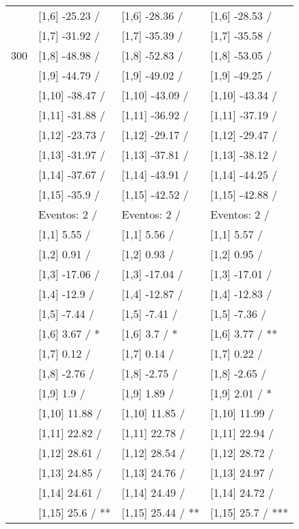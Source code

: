 \begin{table}
\begin{tabular}[t]{llll}
 & {}[1,6] -25.23  / & {}[1,6] -28.36  / & {}[1,6] -28.53  /\\
 & {}[1,7] -31.92  / & {}[1,7] -35.39  / & {}[1,7] -35.58  /\\
300 & {}[1,8] -48.98  / & {}[1,8] -52.83  / & {}[1,8] -53.05  /\\
\addlinespace
 & {}[1,9] -44.79  / & {}[1,9] -49.02  / & {}[1,9] -49.25  /\\
 & {}[1,10] -38.47  / & {}[1,10] -43.09  / & {}[1,10] -43.34  /\\
 & {}[1,11] -31.88  / & {}[1,11] -36.92  / & {}[1,11] -37.19  /\\
 & {}[1,12] -23.73  / & {}[1,12] -29.17  / & {}[1,12] -29.47  /\\
 & {}[1,13] -31.97  / & {}[1,13] -37.81  / & {}[1,13] -38.12  /\\
\addlinespace
 & {}[1,14] -37.67  / & {}[1,14] -43.91  / & {}[1,14] -44.25  /\\
 & {}[1,15] -35.9  / & {}[1,15] -42.52  / & {}[1,15] -42.88  /\\
 & Eventos:  2 / & Eventos:  2 / & Eventos:  2 /\\
 & {}[1,1] 5.55  / & {}[1,1] 5.56  / & {}[1,1] 5.57  /\\
 & {}[1,2] 0.91  / & {}[1,2] 0.93  / & {}[1,2] 0.95  /\\
\addlinespace
 & {}[1,3] -17.06  / & {}[1,3] -17.04  / & {}[1,3] -17.01  /\\
 & {}[1,4] -12.9  / & {}[1,4] -12.87  / & {}[1,4] -12.83  /\\
 & {}[1,5] -7.44  / & {}[1,5] -7.41  / & {}[1,5] -7.36  /\\
 & {}[1,6] 3.67  / * & {}[1,6] 3.7  / * & {}[1,6] 3.77  / **\\
 & {}[1,7] 0.12  / & {}[1,7] 0.14  / & {}[1,7] 0.22  /\\
\addlinespace
500 & {}[1,8] -2.76  / & {}[1,8] -2.75  / & {}[1,8] -2.65  /\\
 & {}[1,9] 1.9  / & {}[1,9] 1.89  / & {}[1,9] 2.01  / *\\
 & {}[1,10] 11.88  / & {}[1,10] 11.85  / & {}[1,10] 11.99  /\\
 & {}[1,11] 22.82  / & {}[1,11] 22.78  / & {}[1,11] 22.94  /\\
 & {}[1,12] 28.61  / & {}[1,12] 28.54  / & {}[1,12] 28.72  /\\
\addlinespace
 & {}[1,13] 24.85  / & {}[1,13] 24.76  / & {}[1,13] 24.97  /\\
 & {}[1,14] 24.61  / & {}[1,14] 24.49  / & {}[1,14] 24.72  /\\
 & {}[1,15] 25.6  / ** & {}[1,15] 25.44  / ** & {}[1,15] 25.7  / ***\\
\bottomrule
\end{tabular}
\end{table}
